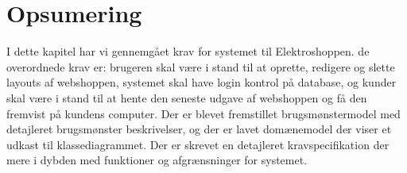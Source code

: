 \section{Opsumering}
I dette kapitel har vi gennemgået krav for systemet til Elektroshoppen. de overordnede krav er: brugeren skal være i stand til at oprette, redigere og slette layouts af webshoppen, systemet skal have login kontrol på database, og kunder skal være i stand til at hente den seneste udgave af webshoppen og få den fremvist på kundens computer. Der er blevet fremstillet brugsmønstermodel med detajleret brugsmønster beskrivelser, og der er lavet domænemodel der viser et udkast til klassediagrammet. Der er skrevet en detajleret kravspecifikation der mere i dybden med funktioner og afgrænsninger for systemet.
\FloatBarrier